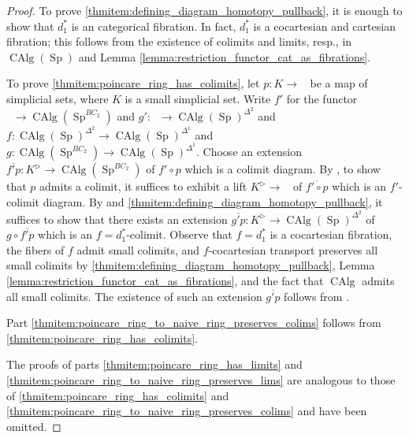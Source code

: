 \documentclass{article}
\DeclareMathOperator{\CAlg}{CAlg} %
\DeclareMathOperator{\CAlgp}{CAlg^p} %
\DeclareMathOperator{\Spectra}{Sp} %
\theoremstyle{definition}
\newcommand{\Lucy}[1]{\todo[color=cyan!30]{\linespread{1}\footnotesize L: #1}}
\begin{document}
\begin{proof}
    To prove \ref{thmitem:defining_diagram_homotopy_pullback}, it is enough to show that $d_1^*$ is an categorical fibration. 
    In fact, $ d_1^* $ is a cocartesian and cartesian fibration; this follows from the existence of colimits and limits, resp., in $ \CAlg(\Spectra) $ and Lemma \ref{lemma:restriction_functor_cat_as_fibrations}. 

    To prove \ref{thmitem:poincare_ring_has_colimits}, let $p:K\to \CAlgp$ be a map of simplicial sets, where $K$ is a small simplicial set. 
    Write $ f' $ for the functor $\CAlgp \to \CAlg(\Spectra^{BC_2})$ and $ g'\colon \CAlgp \to  \CAlg(\Spectra)^{\Delta^2} $ and $ f \colon \CAlg(\Spectra)^{\Delta^2} \to  \CAlg(\Spectra)^{\Delta^1} $ and $ g \colon \CAlg(\Spectra^{BC_2}) \to  \CAlg(\Spectra)^{\Delta^1} $. 
    Choose an extension $ \overline{f'p} \colon K^\vartriangleright\to \CAlg(\Spectra^{BC_2}) $ of $ f'\circ p $ which is a colimit diagram. 
    By \cite[Proposition 4.3.1.5(2)]{HTT}, to show that $ p $ admits a colimit, it suffices to exhibit a lift $ K^\vartriangleright \to \CAlgp $ of $ \overline{f' \circ p} $ which is an $ f' $-colimit diagram. 
    By \cite[Proposition 4.3.1.5(4)]{HTT} and \ref{thmitem:defining_diagram_homotopy_pullback}, it suffices to show that there exists an extension $ \overline{g'p} \colon K^\vartriangleright \to \CAlg(\Spectra)^{\Delta^2} $ of $ g \circ \overline{f'p} $ which is an $ f=d_1^* $-colimit. 
    Observe that $ f= d_1^* $ is a cocartesian fibration, the fibers of $ f $ admit small colimits, and $ f $-cocartesian transport preserves all small colimits by \ref{thmitem:defining_diagram_homotopy_pullback}, Lemma \ref{lemma:restriction_functor_cat_as_fibrations}, and the fact that $ \CAlg $ admits all small colimits. 
    The existence of such an extension $ \overline{g'p} $ follows from \cite[Corollary 4.3.1.11]{HTT}. 

    Part \ref{thmitem:poincare_ring_to_naive_ring_preserves_colims} follows from \ref{thmitem:poincare_ring_has_colimits}. 

    The proofs of parts \ref{thmitem:poincare_ring_has_limits} and \ref{thmitem:poincare_ring_to_naive_ring_preserves_lims} are analogous to those of \ref{thmitem:poincare_ring_has_colimits} and \ref{thmitem:poincare_ring_to_naive_ring_preserves_colims} and have been omitted. 


\end{proof}
\end{document}

